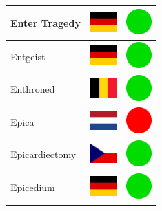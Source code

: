 \documentclass[12pt, a4paper, twoside]{report}
\begin{document}
\begin{center}
\begin{longtable}{|p{5cm}|p{2cm}|p{2cm}|}
 Enter Tragedy                                              & \includegraphics[width=1cm]{../4x3/de} &   \includegraphics[width=1cm]{../likes/y} \\ \hline
 Entgeist                                                   & \includegraphics[width=1cm]{../4x3/de} &   \includegraphics[width=1cm]{../likes/y} \\ \hline
 Enthroned                                                  & \includegraphics[width=1cm]{../4x3/be} &   \includegraphics[width=1cm]{../likes/y} \\ \hline
 Epica                                                      & \includegraphics[width=1cm]{../4x3/nl} &   \includegraphics[width=1cm]{../likes/n} \\ \hline
 Epicardiectomy                                             & \includegraphics[width=1cm]{../4x3/cz} &   \includegraphics[width=1cm]{../likes/y} \\ \hline
 Epicedium                                                  & \includegraphics[width=1cm]{../4x3/de} &   \includegraphics[width=1cm]{../likes/y} \\ \hline

\end{longtable}
\end{center}
\end{document}
